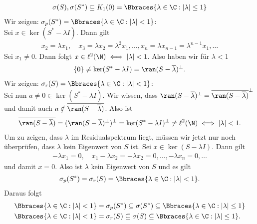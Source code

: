 \begin{solution}
\begin{enumerate}[label = (\alph*)]
  \begin{align*}
    \sigma(S), \sigma(S^*) \subseteq K_{1}(0) = \Bbraces{\lambda \in \C: |\lambda| \leq 1}
  \end{align*}
  Wir zeigen: $\sigma_p(S^\ast) = \Bbraces{\lambda \in \C: |\lambda| < 1}$: \\
  Sei $x \in \ker(S^* - \lambda I)$. Dann gilt
  \begin{align*}
    x_2 = \lambda x_1, \quad x_3 = \lambda x_2 = \lambda^2 x_1, \dots, x_n = \lambda x_{n-1} = \lambda^{n-1} x_1, \dots
  \end{align*}
  Sei $x_1 \neq 0$. Dann folgt $x \in \ell^2(\N) \iff |\lambda| < 1$.
  Also haben wir für $\lambda < 1$
  \begin{align*}
    \{0\} \neq \ker(S^* - \lambda I) = \ran(S - \overline{\lambda})^{\bot}.
  \end{align*}
  Wir zeigen: $\sigma_r(S) = \Bbraces{\lambda \in \C: |\lambda| < 1}$: \\
  Sei nun $a \neq 0 \in \ker(S^* - \lambda I)$.
  Wir wissen, dass $\ran(S - \overline{\lambda})^{\bot} = \overline{\ran(S - \overline{\lambda})}^{\bot}$
  und damit auch $a \notin \overline{\ran(S - \overline{\lambda})}$. Also ist
  \begin{align*}
     \overline{\ran(S - \overline{\lambda})} = (\ran(S - \overline{\lambda})^{\bot})^{\bot}
     = \ker(S^* - \lambda I)^{\bot} \neq \ell^2(\N) \iff |\lambda| < 1.
  \end{align*}
  Um zu zeigen, dass $\lambda$ im Residualspektrum liegt, müssen wir jetzt nur noch
  überprüfen, dass $\lambda$ kein Eigenwert von $S$ ist.
  Sei $x \in \ker(S - \lambda I)$. Dann gilt
  \begin{align*}
    -\lambda x_1 = 0, \quad x_1 - \lambda x_2 = -\lambda x_2 = 0, \dots, -\lambda x_n = 0, \dots
  \end{align*}
  und damit $x = 0$. Also ist $\lambda$ kein Eigenwert von $S$ und es gilt
  \begin{align*}
    \sigma_p(S^\ast) = \sigma_r(S) = \Bbraces{\lambda \in \C: |\lambda| < 1}.
  \end{align*}
  Daraus folgt
  \begin{align*}
    \Bbraces{\lambda \in \C: |\lambda| < 1} &= \sigma_p(S^\ast) \subseteq \sigma(S^*) \subseteq \Bbraces{\lambda \in \C: |\lambda| \leq 1} \\
    \Bbraces{\lambda \in \C: |\lambda| < 1} &= \sigma_r(S) \subseteq \sigma(S) \subseteq \Bbraces{\lambda \in \C: |\lambda| \leq 1}.
  \end{align*}

\end{enumerate}
\end{solution}
